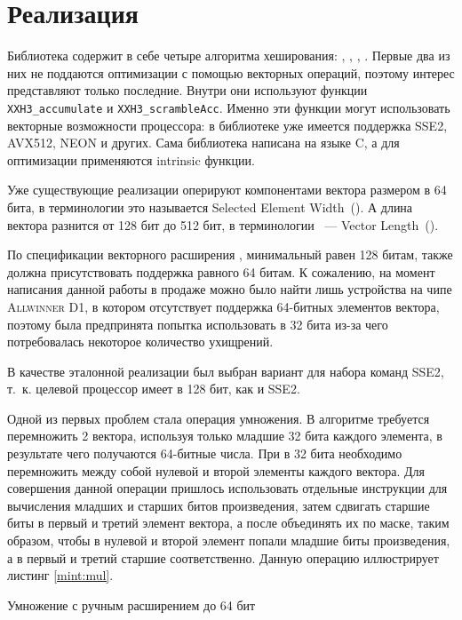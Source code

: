 
\section{Реализация}

Библиотека содержит в себе четыре алгоритма хеширования: , , , .
Первые два из них не поддаются оптимизации с помощью векторных операций, поэтому интерес представляют только последние.
Внутри они используют функции \texttt{XXH3\_accumulate} и \texttt{XXH3\_scrambleAcc}.
Именно эти функции могут использовать векторные возможности процессора: в библиотеке уже имеется поддержка \textsc{SSE2, AVX512, NEON} и других.
Сама библиотека написана на языке \textsc{C}, а для оптимизации применяются intrinsic функции.

Уже существующие реализации оперируют компонентами вектора размером в 64 бита, в терминологии \riscv{} это называется Selected Element Width~(\sew{}).
А длина вектора разнится от 128 бит до 512 бит, в терминологии \riscv{}~--- Vector Length~(\vl{}).

По спецификации векторного расширения \riscv{}, минимальный \vl{} равен 128 битам, также должна присутствовать поддержка \sew{} равного 64 битам.
К сожалению, на момент написания данной работы в продаже можно было найти лишь устройства на чипе \textsc{Allwinner D1}, в котором отсутствует поддержка 64-битных элементов вектора, поэтому была предпринята попытка использовать \sew{} в 32 бита из-за чего потребовалась некоторое количество ухищрений.

В качестве эталонной реализации был выбран вариант для набора команд \textsc{SSE2}, т.~к. целевой процессор имеет \vl{} в 128 бит, как и \textsc{SSE2}.

Одной из первых проблем стала операция умножения.
В алгоритме требуется перемножить 2 вектора, используя только младшие 32 бита каждого элемента, в результате чего получаются 64-битные числа.
При \sew{} в 32 бита необходимо перемножить между собой нулевой и второй элементы каждого вектора.
Для совершения данной операции пришлось использовать отдельные инструкции для вычисления младших и старших битов произведения, затем сдвигать старшие биты в первый и третий элемент вектора, а после объединять их по маске, таким образом, чтобы в нулевой и второй элемент попали младшие биты произведения, а в первый и третий старшие соответственно.
Данную операцию иллюстрирует листинг \ref{mint:mul}.
\begin{listing}
	\caption{Умножение с ручным расширением до 64 бит}
	\label{mint:mul}
	\inputminted[breaklines, frame=single]{c}{figures/mul.c}
\end{listing}


